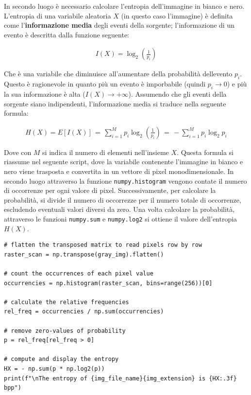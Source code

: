 \FloatBarrier\noindent In secondo luogo è necessario calcolare l'entropia dell'immagine in bianco e nero. L'entropia di una variabile aleatoria $X$ (in questo caso l'immagine) è definita come l'\textbf{informazione media} degli eventi della sorgente; l'informazione di un evento è descritta dalla funzione seguente:

\begin{gather*}
    I(X) = \log_2\left( \frac{1}{p_i} \right)
\end{gather*}

\noindent Che è una variabile che diminuisce all'aumentare della probabilità dellevento $p_i$. Questo è ragionevole in quanto più un evento è imporbabile (quindi $p_i \to 0$) e più la sua informazione è alta ($I(X) \to +\infty$). Assumendo che gli eventi della sorgente siano indipendenti, l'informazione media si traduce nella seguente formula:

\begin{gather*}
    H(X) = E[I(X)] \, = \, \sum_{i = 1}^M p_i\log_2\left( \frac{1}{p_i} \right) \, = \, - \sum_{i = 1}^M p_i\log_2{p_i}
\end{gather*}

\noindent Dove con $M$ si indica il numero di elementi nell'insieme $X$. Questa formula si riassume nel seguente script, dove la variabile contenente l'immagine in bianco e nero viene trasposta e convertita in un vettore di pixel monodimensionale. In secondo luogo attraverso la funzione \texttt{numpy.histogram} vengono contate il numero di occorrenze per ogni valore di pixel. Successivamente, per calcolare la probabilità, si divide il numero di occorrezze per il numero totale di occorrenze, escludendo eventuali valori diversi da zero. Una volta calcolare la probabilità, attraverso le funzioni  \texttt{numpy.sum} e \texttt{numpy.log2} si ottiene il valore dell'entropia $H(X)$.


\begin{lstlisting}
# flatten the transposed matrix to read pixels row by row
raster_scan = np.transpose(gray_img).flatten()

# count the occurrences of each pixel value
occurrencies = np.histogram(raster_scan, bins=range(256))[0]

# calculate the relative frequencies
rel_freq = occurrencies / np.sum(occurrencies)

# remove zero-values of probability
p = rel_freq[rel_freq > 0]

# compute and display the entropy
HX = - np.sum(p * np.log2(p))
print(f"\nThe entropy of {img_file_name}{img_extension} is {HX:.3f} bpp")
\end{lstlisting}

